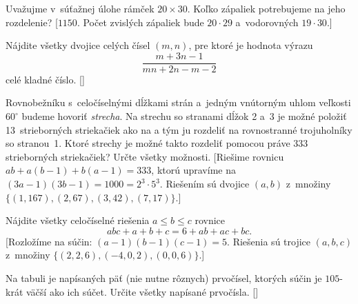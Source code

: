 {Uvažujme v~súťažnej úlohe rámček $20\times 30$. Koľko zápaliek potrebujeme na jeho rozdelenie?
[$1150$. Počet zvislých zápaliek bude $20\cdot 29$ a~vodorovných $19\cdot 30$.]

\D

Nájdite všetky dvojice celých čísel $(m,n)$, pre ktoré je hodnota výrazu
$$
\frac{m+3n-1}{mn+2n-m-2}
$$
celé kladné číslo. []

Rovnobežníku s~celočíselnými dĺžkami strán a~jedným vnútorným uhlom veľkosti $60^\circ$ budeme hovoriť \emph{strecha}. Na strechu so stranami dĺžok 2 a~3 je možné položiť 13~strieborných striekačiek ako na \obr{} a tým ju rozdeliť na rovnostranné trojuholníky so stranou~1. Ktoré strechy je možné takto rozdeliť pomocou práve 333 strieborných striekačiek? Určte všetky možnosti.
%
[Riešime rovnicu $ab+a(b-1)+b(a-1)=333$, ktorú upravíme na ${(3a-1)}{(3b-1)}=1000=2^3\cdot 5^3$. Riešením sú dvojice $(a,b)$ z~množiny $\{(1,167), (2,67), (3,42), (7,17)\}$.]

Nájdite všetky celočíselné riešenia $a\leq b\leq c$ rovnice
$$abc +a+b+c = 6 + ab + ac + bc.$$
[Rozložíme na súčin: $(a-1)(b-1)(c-1) =5$. Riešenia sú trojice $(a,b,c)$ z~množiny $\{(2,2,6),({-4},0,2),(0,0,6)\}$.]

Na tabuli je napísaných päť (nie nutne rôznych) prvočísel, ktorých súčin je $105$-krát väčší ako ich súčet. Určite všetky napísané prvočísla. []


}

